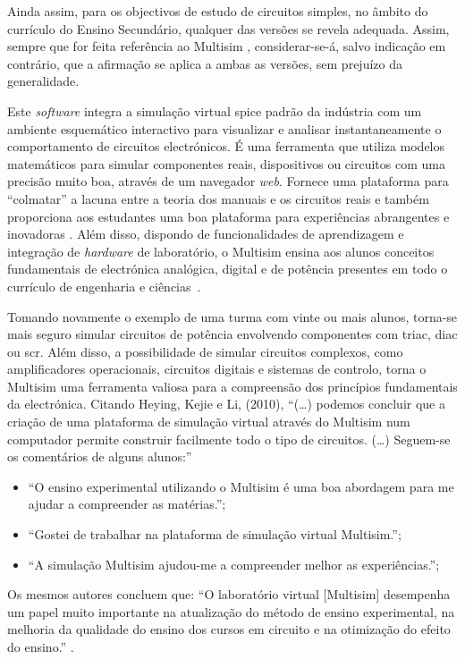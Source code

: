 Ainda assim, para os objectivos de estudo de circuitos simples, no âmbito do currículo do Ensino Secundário, qualquer das versões se revela adequada. Assim, sempre que for feita referência ao Multisim \cite{multisim}, considerar-se-á, salvo indicação em contrário, que a afirmação se aplica a ambas as versões, sem prejuízo da generalidade.

Este \textit{software} integra a simulação virtual \acrfull{spice} padrão da indústria com um ambiente esquemático interactivo para visualizar e analisar instantaneamente o comportamento de circuitos electrónicos. É uma ferramenta que utiliza modelos matemáticos para simular componentes reais, dispositivos ou circuitos com uma precisão muito boa, através de um navegador \textit{web}. Fornece uma plataforma para ``colmatar'' a lacuna entre a teoria dos manuais e os circuitos reais e também proporciona aos estudantes uma boa plataforma para experiências abrangentes e inovadoras \cite{multisim}. Além disso, dispondo de funcionalidades de aprendizagem e integração de \textit{hardware} de laboratório, o Multisim ensina aos alunos conceitos fundamentais de electrónica analógica, digital e de potência presentes em todo o currículo de engenharia e ciências~\cite{ImportantSimSoftware}.

Tomando novamente o exemplo de uma turma com vinte ou mais alunos, torna-se mais seguro simular circuitos de potência envolvendo componentes com \gls{triac}, \gls{diac} ou \gls{scr}. Além disso, a possibilidade de simular circuitos complexos, como amplificadores operacionais, circuitos digitais e sistemas de controlo, torna o Multisim uma ferramenta valiosa para a compreensão dos princípios fundamentais da electrónica. Citando Heying, Kejie e Li, (2010), ``(\ldots) podemos concluir que a criação de uma plataforma de simulação virtual através do Multisim num computador permite construir facilmente todo o tipo de circuitos. (\ldots) Seguem-se os comentários de alguns alunos:''
\begin{itemize}
    \item ``O ensino experimental utilizando o Multisim é uma boa abordagem para me ajudar a compreender as matérias.'';
    \item ``Gostei de trabalhar na plataforma de simulação virtual Multisim.'';
    \item ``A simulação Multisim ajudou-me a compreender melhor as experiências.'';
\end{itemize}

Os mesmos autores concluem que: ``O laboratório virtual [Multisim] desempenha um papel muito importante na atualização do método de ensino experimental, na melhoria da qualidade do ensino dos cursos em circuito e na otimização do efeito do ensino.'' \cite{heying}.

